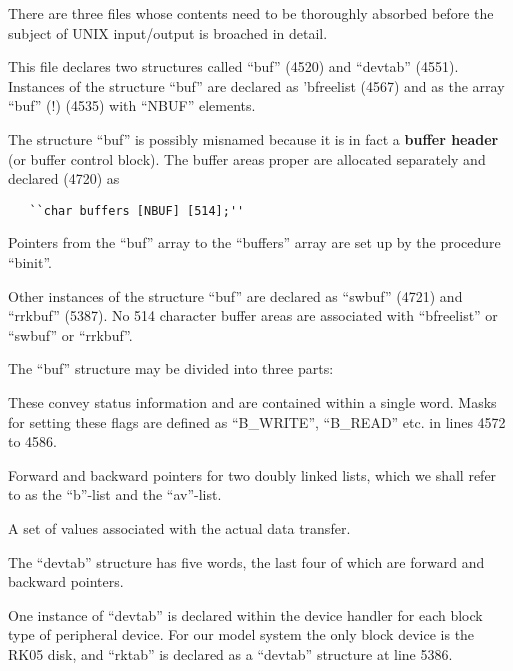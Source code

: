 %
%

There are three files whose contents
need to be thoroughly absorbed before
the subject of UNIX input/output is
broached in detail.


This file declares two structures
called ``buf'' (4520) and ``devtab''
(4551). Instances of the structure
``buf'' are declared as 'bfreelist
(4567) and as the array ``buf'' (!)
(4535) with ``NBUF'' elements.

The structure ``buf'' is possibly
misnamed because it is in fact a {\bf buffer
header} (or buffer control block). The
buffer areas proper are allocated
separately and declared (4720) as

\begin{verbatim}
   ``char buffers [NBUF] [514];''
\end{verbatim}

Pointers from the ``buf'' array to the
``buffers'' array are set up by the procedure ``binit''.


Other instances of the structure ``buf''
are declared as ``swbuf'' (4721) and
``rrkbuf'' (5387). No 514 character
buffer areas are associated with
``bfreelist'' or ``swbuf'' or ``rrkbuf''.

The ``buf'' structure may be divided into
three parts:

\bd
\item[(a) flags] These convey status information and are contained within
 a single word. Masks for setting these flags are defined as
 ``B\_WRITE'', ``B\_READ'' etc. in lines 4572 to 4586.

\item[(b) list pointer] Forward and backward pointers for two doubly
 linked lists, which we shall
 refer to as the ``b''-list and the
 ``av''-list.

\item[(c)  i/o parameters] A set of values
 associated with the actual data
 transfer.
\ed


The ``devtab'' structure has five words,
the last four of which are forward and
backward pointers.

One instance of ``devtab'' is declared
within the device handler for each
block type of peripheral device. For
our model system the only block device
is the RK05 disk, and ``rktab'' is
declared as a ``devtab'' structure at
line 5386.

